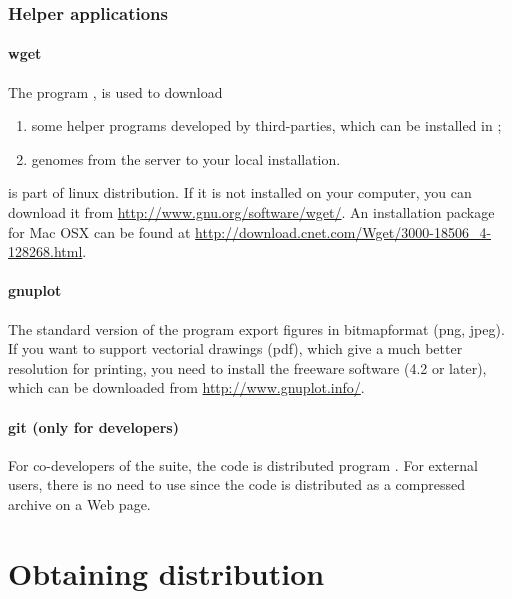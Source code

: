 \documentclass[12pt,a4paper, oneside]{scrreprt} %
\begin{document}
\subsection{Helper applications}



\subsubsection{wget}

The program , is used  to download
\begin{enumerate}

\item some helper programs developed by third-parties, which can be
  installed in \RSAT;

\item genomes from the \RSAT server to your local \RSAT installation.

\end{enumerate}

 is part of linux distribution. If it is not installed
on your computer, you can download it from
\url{http://www.gnu.org/software/wget/}.  An installation package for
Mac OSX can be found at
\url{http://download.cnet.com/Wget/3000-18506_4-128268.html}.


\subsubsection{gnuplot}

The standard version of the \RSAT program  export
figures in bitmapformat (png, jpeg). If you want to support vectorial
drawings (pdf), which give a much better resolution for printing, you
need to install the freeware software  (4.2 or
later), which can be downloaded from \url{http://www.gnuplot.info/}.


\subsubsection{git (only for developers)}

For co-developers of the \RSAT suite, the code is distributed program
. For external users, there is no need to use
 since the code is distributed as a compressed archive on
a Web page.


\chapter{Obtaining \RSAT distribution}
\end{document}
